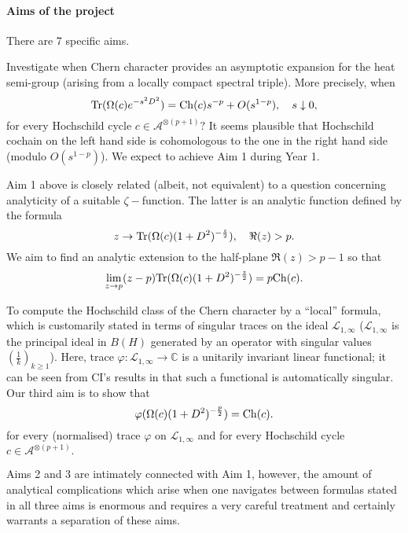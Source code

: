\documentclass[12pt]{article}
\begin{document}
\paragraph*{Aims of the project} There are 7 specific aims.


 Investigate when Chern character provides an asymptotic expansion for the heat semi-group (arising from a locally compact spectral triple). More precisely, when 
\begin{equation}\label{heat eq}
{\rm Tr}(\Omega(c)e^{-s^2D^2})={\rm Ch}(c)s^{-p}+O(s^{1-p}),\quad s\downarrow0,
\end{equation}
for every Hochschild cycle $c\in\mathcal{A}^{\otimes (p+1)}?$ It seems plausible that Hochschild cochain on the left hand side is cohomologous to the one in the right hand side (modulo $O(s^{1-p})$). We expect to achieve Aim 1 during Year 1.

 Aim 1 above is closely related (albeit, not equivalent) to a question concerning analyticity of a suitable $\zeta-$function. The latter is an analytic function defined by the formula
$$z\to {\rm Tr}(\Omega(c)(1+D^2)^{-\frac{z}{2}}),\quad \Re(z)>p.$$
We aim to find an analytic extension to the half-plane $\Re(z)>p-1$ so that
$$\lim_{z\to p}(z-p){\rm Tr}(\Omega(c)(1+D^2)^{-\frac{z}{2}})=p{\rm Ch}(c).$$

 To compute the Hochschild class of the Chern character by a ``local'' formula, which is customarily  stated in terms of singular traces on the ideal $\mathcal{L}_{1,\infty}$ ($\mathcal{L}_{1,\infty}$ is the principal ideal in $B(H)$ generated by an operator with singular values $(\frac1k)_{k\geq1}$). Here, trace $\varphi:\mathcal{L}_{1,\infty}\to\mathbb{C}$ is a unitarily invariant linear functional; it can be seen from CI's results in \cite{book} that such a functional is automatically singular. Our third aim is to show that
\begin{equation}\label{super main eq}
\varphi(\Omega(c)(1+D^2)^{-\frac{p}{2}})={\rm Ch}(c).
\end{equation}
for every (normalised) trace $\varphi$ on $\mathcal{L}_{1,\infty}$ and for every Hochschild cycle $c\in\mathcal{A}^{\otimes (p+1)}.$ 

Aims 2 and 3 are intimately connected with Aim 1, however, the amount of analytical complications which arise when one navigates between formulas stated in all three aims is enormous and requires a very careful treatment and certainly warrants a separation of these aims.
\end{document}
